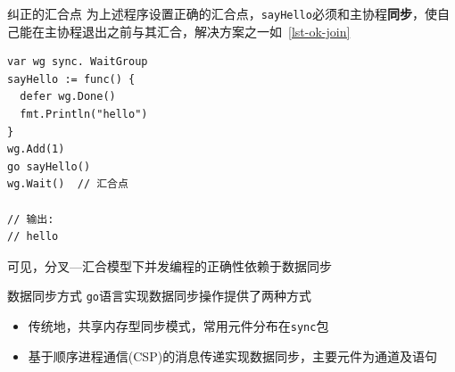 \begin{frame}[fragile]{纠正的汇合点}
为上述程序设置正确的汇合点，\texttt{sayHello}必须和主协程\textbf{同步}，使自己能在主协程退出之前与其汇合，解决方案之一如\lstlistingname~\ref{lst-ok-join}

\begin{lstlisting}[caption={利用同步确保\texttt{sayHello}在主协程退出之前与其汇合},label=lst-ok-join]
var wg sync. WaitGroup
sayHello := func() {
  defer wg.Done()
  fmt.Println("hello")
}
wg.Add(1)
go sayHello()
wg.Wait()  // 汇合点

// 输出:
// hello    
\end{lstlisting}

\alert{可见，分叉---汇合模型下并发编程的正确性依赖于数据同步}
\end{frame}

\begin{frame}{数据同步方式}
\texttt{go}语言实现数据同步操作提供了两种方式
\begin{itemize}
    \item 传统地，\alert{共享内存型同步模式}，常用元件分布在\texttt{sync}包
    \item \alert{基于顺序进程通信(CSP)}的消息传递实现数据同步，主要元件为通道\channel 及\select 语句
\end{itemize}
\end{frame}